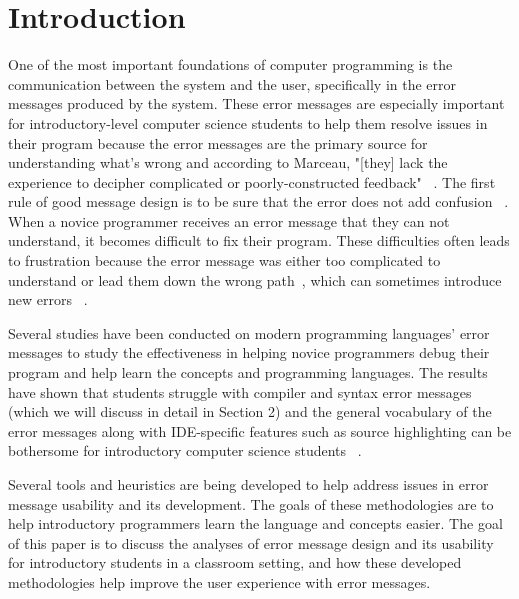 \documentclass{sig-alternate}
\begin{document}


\section{Introduction}\label{intro}
One of the most important foundations of computer programming is the communication between the system and the user, specifically in the error messages produced by the system. These error messages are especially important for introductory-level computer science students to help them resolve issues in their program because the error messages are the primary source for understanding what's wrong and according to Marceau, "[they] lack the experience to decipher complicated or poorly-constructed feedback" ~\cite{Marceau:2011:MEE:1953163.1953308}. The first rule of good message design is to be sure that the error does not add confusion ~\cite{Isa:1983:MOE:800045.801583}. When a novice programmer receives an error message that they can not understand, it becomes difficult to fix their program. These difficulties often leads to frustration because the error message was either too complicated to understand or lead them down the wrong path~\cite{Marceau:2011:MYL:2048237.2048241}, which can sometimes introduce new errors ~\cite{Denny:2014:ESE:2591708.2591748}. 

Several studies have been conducted on modern programming languages' error messages to study the effectiveness in helping novice programmers debug their program and help learn the concepts and programming languages. The results have shown that students struggle with compiler and syntax error messages ~\cite{Denny:2014:ESE:2591708.2591748} ~\cite{Traver:2010} (which we will discuss in detail in Section 2) and the general vocabulary of the error messages along with IDE-specific features such as source highlighting can be bothersome for introductory computer science students ~\cite{Marceau:2011:MYL:2048237.2048241}. 

Several tools and heuristics are being developed to help address issues in error message usability and its development. The goals of these methodologies are to help introductory programmers learn the language and concepts easier. The goal of this paper is to discuss the analyses of error message design and its usability for introductory students in a classroom setting, and how these developed methodologies help improve the user experience with error messages. 
\end{document}

